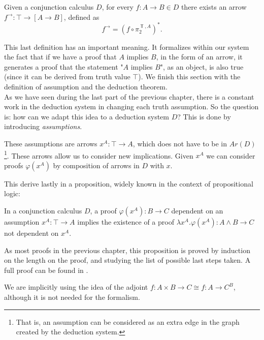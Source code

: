 \begin{definition}
  Given a conjunction calculus $D$, for every $f:A\to B \in D$ there exists an arrow $f^\to: \top \to [A\to B]$, defined as 
  $$f^\to = \left(f\circ \pi_2^{\Top,A}\right)^*.$$
\end{definition}

This last definition has an important meaning. It formalizes within our system the fact that if we have a proof that $A$ implies $B$, in the form of an arrow, it generates a proof that the statement "$A$ implies $B$", as an object, is also true (since it can be derived from truth value $\top$). We finish this section with the definition of assumption and the deduction theorem.\\

As we have seen during the last part of the previous chapter, there is a constant work in the deduction system in changing each truth assumption. So the question is: how can we adapt this idea to a deduction system $D$? This is done by introducing \emph{assumptions}.

\begin{definition}\label{assumptions}
These assumptions are arrows $x^A: \top \to A$, which does not have to be in $Ar(D)$\footnote{That is, an assumption can be considered as an extra edge in the graph created by the deduction system.}. These arrows allow us to consider new implications. Given $x^A$ we can consider proofs $\varphi(x^A)$ by composition of arrows in $D$ with $x$.
\end{definition}
This derive lastly in  a proposition, widely known in the context of propositional logic:

\begin{theorem}\label{deduction-theorem}
  In a conjunction calculus $D$, a proof $\varphi(x^A): B \to C$ dependent on an assumption $x^A: \top \to A$ implies the existence of a proof $\lambda x^A.\varphi (x^A): A\land B \to C$ not dependent on $x^A$.
\end{theorem}
\begin{sproof}
  As most proofs in the previous chapter, this proposition is proved by induction on the length on the proof, and studying the list of possible last steps taken. A full proof can be found in \cite[proposition 2.1]{lambek1988introduction}.
\end{sproof}
 We are implicitly using the idea of the adjoint $f:A\times B \to C \cong f: A \to C^B$, although it is not needed for the formalism.





